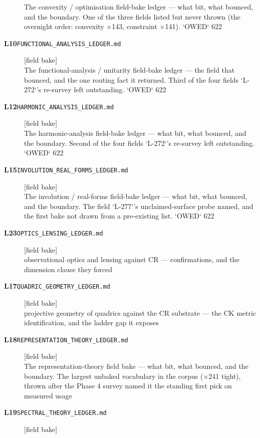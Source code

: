 \begin{description}
The convexity / optimisation field-bake ledger --- what bit, what bounced, and the boundary. One of the three fields listed but never thrown (the overnight order: convexity $\times$143, constraint $\times$141). `OWED` 622
\item[\ldglabel{functional_analysis}{L10}\textbf{L10}\quad\texttt{FUNCTIONAL\_ANALYSIS\_LEDGER.md}]\hfill\textsf{[field bake]}\\
The functional-analysis / unitarity field-bake ledger --- the field that bounced, and the one routing fact it returned. Third of the four fields `L-272`'s re-survey left outstanding. `OWED` 622
\item[\ldglabel{harmonic_analysis}{L12}\textbf{L12}\quad\texttt{HARMONIC\_ANALYSIS\_LEDGER.md}]\hfill\textsf{[field bake]}\\
The harmonic-analysis field-bake ledger --- what bit, what bounced, and the boundary. Second of the four fields `L-272`'s re-survey left outstanding. `OWED` 622
\item[\ldglabel{involution_real_forms}{L15}\textbf{L15}\quad\texttt{INVOLUTION\_REAL\_FORMS\_LEDGER.md}]\hfill\textsf{[field bake]}\\
The involution / real-forms field-bake ledger --- what bit, what bounced, and the boundary. The field `L-277`'s unclaimed-surface probe named, and the first bake not drawn from a pre-existing list. `OWED` 622
\item[\ldglabel{optics_lensing}{L23}\textbf{L23}\quad\texttt{OPTICS\_LENSING\_LEDGER.md}]\hfill\textsf{[field bake]}\\
observational optics and lensing against CR --- confirmations, and the dimension clause they forced
\item[\ldglabel{quadric_geometry}{L17}\textbf{L17}\quad\texttt{QUADRIC\_GEOMETRY\_LEDGER.md}]\hfill\textsf{[field bake]}\\
projective geometry of quadrics against the CR substrate --- the CK metric identification, and the ladder gap it exposes
\item[\ldglabel{representation_theory}{L18}\textbf{L18}\quad\texttt{REPRESENTATION\_THEORY\_LEDGER.md}]\hfill\textsf{[field bake]}\\
The representation-theory field bake --- what bit, what bounced, and the boundary. The largest unbaked vocabulary in the corpus ($\times$241 tight), thrown after the Phase 4 survey named it the standing first pick on measured usage
\item[\ldglabel{spectral_theory}{L19}\textbf{L19}\quad\texttt{SPECTRAL\_THEORY\_LEDGER.md}]\hfill\textsf{[field bake]}\\

\end{description}
